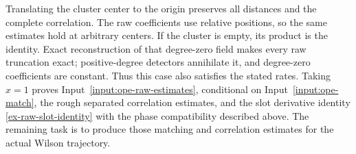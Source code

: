 Translating the cluster center to the origin preserves all distances and
the complete correlation. The raw coefficients use relative positions,
so the same estimates hold at arbitrary centers. If the cluster is empty,
its product is the identity. Exact reconstruction of that degree-zero
field makes every raw truncation exact; positive-degree detectors
annihilate it, and degree-zero coefficients are constant. Thus this case
also satisfies the stated rates. Taking $x=1$ proves
Input~\ref{input:ope-raw-estimates}, conditional on
Input~\ref{input:ope-match}, the rough separated correlation estimates,
and the slot derivative identity \eqref{ex-raw-slot-identity} with the
phase compatibility described above. The remaining task is
to produce those matching and correlation estimates for the actual
Wilson trajectory.
